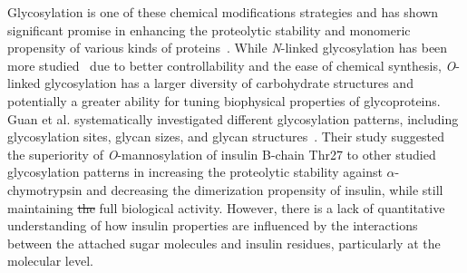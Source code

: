 \documentclass[9pt]{elife}
\providecommand{\DIFdeltex}[1]{{\protect\color{red}\sout{#1}}}                      %
\providecommand{\DIFdelbegin}{} %
\providecommand{\DIFdelend}{} %
\providecommand{\DIFdel}[1]{\texorpdfstring{\DIFdeltex{#1}}{}} %
\begin{document}
Glycosylation is one of these chemical modifications strategies and has shown significant promise in enhancing the proteolytic stability and monomeric propensity of various kinds of proteins~\cite{kayser2011glycosylation, raju2006glycosylation,russell2009site}. While \emph{N}-linked glycosylation has been more studied~\cite{losev2019novel,van2004role, sareneva1995n} due to better controllability and the ease of chemical synthesis, \emph{O}-linked glycosylation has a larger diversity of carbohydrate structures and potentially a greater ability for tuning biophysical properties of glycoproteins. Guan et al. systematically investigated different glycosylation patterns, including glycosylation sites, glycan sizes, and glycan structures~\cite{guan2018chemically}. Their study suggested the superiority of \emph{O}-mannosylation of insulin B-chain Thr27 to other studied glycosylation patterns in increasing the proteolytic stability against $\alpha$-chymotrypsin and decreasing the dimerization propensity of insulin, while still maintaining \DIFdelbegin \DIFdel{the }\DIFdelend full biological activity. However, there is a lack of quantitative understanding of how insulin properties are influenced by the interactions between the attached sugar molecules and insulin residues, particularly at the molecular level. 
\end{document}
